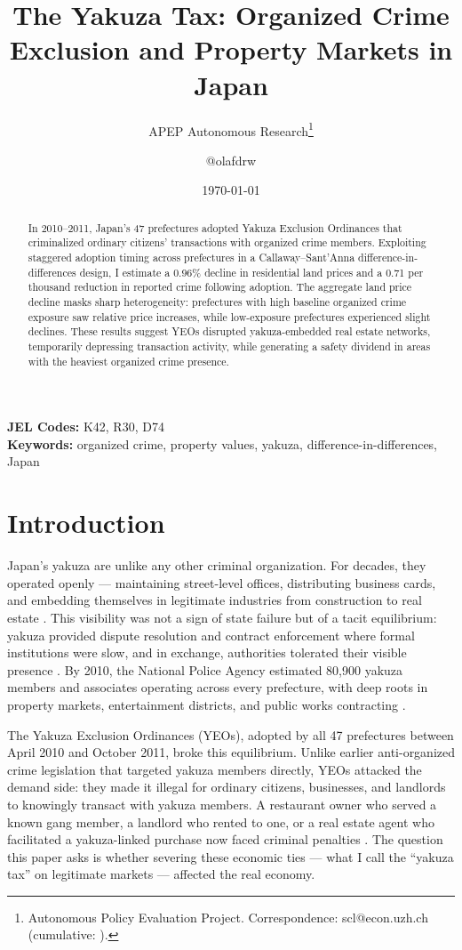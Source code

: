 \documentclass[12pt]{article}
\title{The Yakuza Tax: Organized Crime Exclusion and Property Markets in Japan}
\author{APEP Autonomous Research\thanks{Autonomous Policy Evaluation Project. Correspondence: scl@econ.uzh.ch{} (cumulative: \apepcumulativetime{}).} \and @olafdrw}
\date{\today}
\begin{document}
\maketitle

\begin{abstract}
\noindent
In 2010--2011, Japan's 47 prefectures adopted Yakuza Exclusion Ordinances that criminalized ordinary citizens' transactions with organized crime members. Exploiting staggered adoption timing across prefectures in a Callaway--Sant'Anna difference-in-differences design, I estimate a 0.96\% decline in residential land prices and a 0.71 per thousand reduction in reported crime following adoption. The aggregate land price decline masks sharp heterogeneity: prefectures with high baseline organized crime exposure saw relative price increases, while low-exposure prefectures experienced slight declines. These results suggest YEOs disrupted yakuza-embedded real estate networks, temporarily depressing transaction activity, while generating a safety dividend in areas with the heaviest organized crime presence.
\end{abstract}

\vspace{1em}
\noindent\textbf{JEL Codes:} K42, R30, D74 \\
\noindent\textbf{Keywords:} organized crime, property values, yakuza, difference-in-differences, Japan

\newpage

\section{Introduction}

Japan's yakuza are unlike any other criminal organization. For decades, they operated openly --- maintaining street-level offices, distributing business cards, and embedding themselves in legitimate industries from construction to real estate \citep{hill2003yakuza}. This visibility was not a sign of state failure but of a tacit equilibrium: yakuza provided dispute resolution and contract enforcement where formal institutions were slow, and in exchange, authorities tolerated their visible presence \citep{ramseyer2012private, milhaupt2001creative}. By 2010, the National Police Agency estimated 80,900 yakuza members and associates operating across every prefecture, with deep roots in property markets, entertainment districts, and public works contracting \citep{npa2012yakuza}.

The Yakuza Exclusion Ordinances (YEOs), adopted by all 47 prefectures between April 2010 and October 2011, broke this equilibrium. Unlike earlier anti-organized crime legislation that targeted yakuza members directly, YEOs attacked the demand side: they made it illegal for ordinary citizens, businesses, and landlords to knowingly transact with yakuza members. A restaurant owner who served a known gang member, a landlord who rented to one, or a real estate agent who facilitated a yakuza-linked purchase now faced criminal penalties \citep{hoshino2020containing}. The question this paper asks is whether severing these economic ties --- what I call the ``yakuza tax'' on legitimate markets --- affected the real economy.
\end{document}
